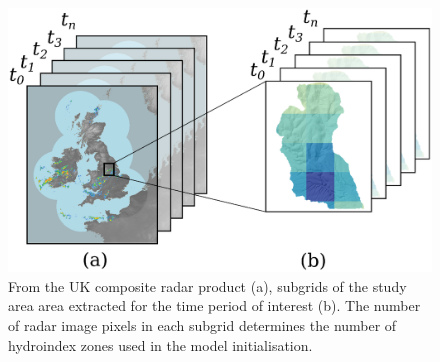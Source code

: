 \begin{figure}[htb]
\includegraphics[width=15cm]{chp_radar/cropradar.eps}
\caption{From the UK composite radar product (a), subgrids of the study area area extracted for the time period of interest (b). The number of radar image pixels in each subgrid determines the number of hydroindex zones used in the model initialisation.}
\label{fig_radar_extract}
\end{figure}

